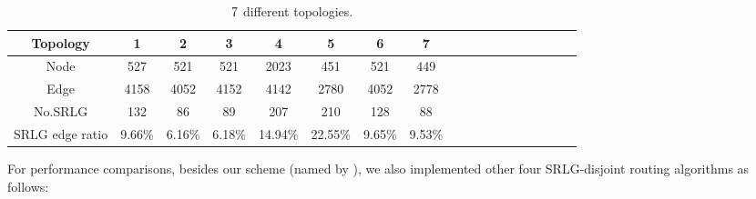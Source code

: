 \begin{table}[tp]
\caption{$7$ different topologies.}
  \centering
\footnotesize{  \begin{tabular}{*{18}{c}}
\toprule
Topology & 1 & 2 & 3 & 4 & 5 & 6& 7   \\
\midrule
Node    &     527&      521    &      521     &    2023             &     451     &     521     &     449       \\
Edge   &    4158 &  4052     &    4152      &   4142          &       2780   &      4052   &      2778    \\
No.SRLG & 132 &  86   &  89  &  207        & 210  &  128  &   88    \\
SRLG edge ratio & 9.66\% & 6.16\% &   6.18\% &   14.94\%    &   22.55\%  &  9.65\% &   9.53\%     \\
\bottomrule
\end{tabular}
}

\label{tab:AllSample}
\end{table}
For performance comparisons, besides our scheme (named by \CI), we also implemented other four SRLG-disjoint routing algorithms as follows:


